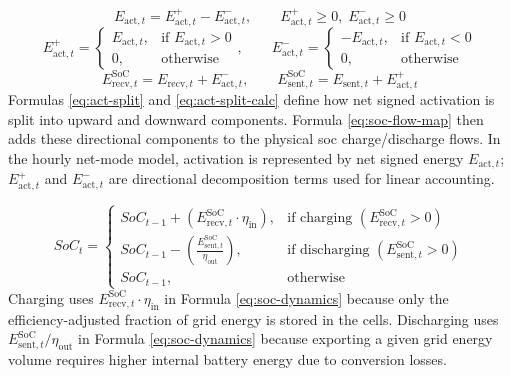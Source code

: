 \begin{equation}\label{eq:act-split}
    E_{\text{act}, t}=E_{\text{act}, t}^{+}-E_{\text{act}, t}^{-},
    \qquad
    E_{\text{act}, t}^{+}\ge 0,\;E_{\text{act}, t}^{-}\ge 0
\end{equation}
\begin{equation}\label{eq:act-split-calc}
    E_{\text{act}, t}^{+}=
    \begin{cases}
        E_{\text{act}, t}, & \text{if } E_{\text{act}, t}>0 \\
        0,                 & \text{otherwise}
    \end{cases}
    ,\qquad
    E_{\text{act}, t}^{-}=
    \begin{cases}
        -E_{\text{act}, t}, & \text{if } E_{\text{act}, t}<0 \\
        0,                  & \text{otherwise}
    \end{cases}
\end{equation}
\begin{equation}\label{eq:soc-flow-map}
    E_{\text{recv}, t}^{\text{SoC}}=E_{\text{recv}, t}+E_{\text{act}, t}^{-},
    \qquad
    E_{\text{sent}, t}^{\text{SoC}}=E_{\text{sent}, t}+E_{\text{act}, t}^{+}
\end{equation}
Formulas \ref{eq:act-split} and \ref{eq:act-split-calc} define how net signed activation is split into upward and downward components.
Formula \ref{eq:soc-flow-map} then adds these directional components to the physical \gls{soc} charge/discharge flows.
In the hourly net-mode model, activation is represented by net signed energy $E_{\text{act}, t}$; $E_{\text{act}, t}^{+}$ and $E_{\text{act}, t}^{-}$ are directional decomposition terms used for linear accounting.

\begin{equation}\label{eq:soc-dynamics}
    SoC_{t} =
    \begin{cases}
        SoC_{t-1} + (E_{\text{recv}, t}^{\text{SoC}} \cdot \eta_{\text{in}}),                 & \text{if charging } (E_{\text{recv}, t}^{\text{SoC}} > 0)    \\
        SoC_{t-1} - \left( \frac{E_{\text{sent}, t}^{\text{SoC}}}{\eta_{\text{out}}} \right), & \text{if discharging } (E_{\text{sent}, t}^{\text{SoC}} > 0) \\
        SoC_{t-1},                                                                            & \text{otherwise}
    \end{cases}
\end{equation}
Charging uses $E_{\text{recv}, t}^{\text{SoC}}\cdot\eta_{\text{in}}$ in Formula \ref{eq:soc-dynamics} because only the efficiency-adjusted fraction of grid energy is stored in the cells.
Discharging uses $E_{\text{sent}, t}^{\text{SoC}}/\eta_{\text{out}}$ in Formula \ref{eq:soc-dynamics} because exporting a given grid energy volume requires higher internal battery energy due to conversion losses.

